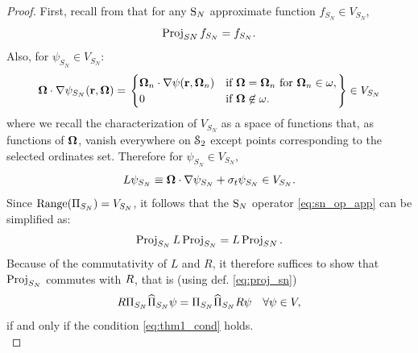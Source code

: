 \begin{proof}
First, recall from  that for any $\SN$ approximate function \mbox{$f_{S_N}\in V_{S_N}$}, 
$$
	\Projop[SN]f_{S_N} = f_{S_N}.
$$
Also, for $\psi_{S_N} \in V_{S_N}$:
$$
	\bomega\cdot\nabla\psi_{S_N}(\br,\bomega) = \left.\pw{
		\bomega_n\cdot\nabla\psi(\br,\bomega_n)}{if $\bomega = \bomega_n$ for $\bomega_n\in\omega$}
		{0}{if $\bomega \not \in \omega$.}\right\} \in V_{S_N}
$$
where we recall the characterization of $V_{S_N}$ as a space of functions that, as functions of $\bomega$, vanish
everywhere on $\Sphere$ except points corresponding to the selected ordinates set. Therefore for $\psi_{S_N} \in
V_{S_N}$, 
$$
	L\psi_{S_N} \equiv \bomega\cdot\nabla\psi_{S_N} + \sigma_t\psi_{S_N} \in V_{S_N}.
$$
Since \mbox{$\Rng (\PiSN) = V_{S_N}$}, it follows that the $\SN$ operator \eqref{eq:sn_op_app} can be simplified as:
\begin{equation}\label{eq:sn_op2}
	\Projop[S_N]\op{L}\Projop[S_N] = \op{L} \Projop[SN].
\end{equation}
Because of the commutativity of $L$ and $R$, it therefore suffices to show that $\Projop[S_N]$ commutes
with $\op{R}$, that is (using def. \eqref{eq:proj_sn})
\begin{equation}\label{eq:thm1_point}
	R \PiSN \PihSN \psi = \PiSN \PihSN R \psi\quad  \forall \psi \in V, 
\end{equation}
if and only if the condition \eqref{eq:thm1_cond} holds.\\[.2em] 


\end{proof}

